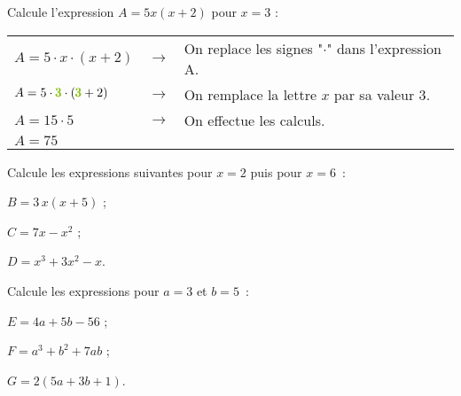 \begin{methode*1}
 
\begin{exemple*1}
Calcule l'expression $A = 5x(x + 2)$ pour $x = 3$ :
\begin{center}
 \begin{tabular}{lcl}
$A = 5 \cdot x \cdot (x + 2)$ & $\longrightarrow$ & On replace les signes "$\cdot$" dans l'expression A. \\
$A = 5 \cdot \textcolor{H1}{\pmb{3}} \cdot (\textcolor{H1}{\pmb{3}} + 2)$ & $\longrightarrow$ & On remplace la lettre $x$ par sa valeur \textcolor{H1}{3}. \\ %
$A = 15 \cdot 5$ & $\longrightarrow$ &  On effectue les calculs. \\
$A= 75$ & & \\
  \end{tabular}
 \end{center}
\end{exemple*1}

\exercice  
Calcule les expressions suivantes pour $x = 2$ puis pour $x = 6$ :

$B = 3\,x(x + 5)$ ;

$C = 7x - x^2$ ;

$D = x^3 + 3x^2 - x$.

\exercice  
Calcule les expressions pour $a = 3$ et $b = 5$ :
     
$E = 4a + 5b - 56$ ;

$F = a^3 + b^2 + 7ab$ ;

$G = 2(5a + 3b + 1)$.

\end{methode*1}